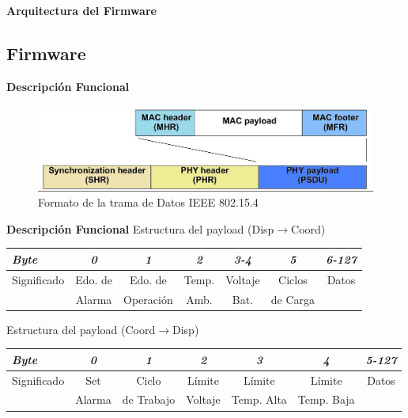 \documentclass[aspectratio=43, handout]{beamer}
\begin{document}
\begin{frame}{\textbf{\LARGE{Arquitectura del Firmware}}}
\end{frame}

\subsection[Firmware]{Firmware}

\begin{frame}{\textbf{\LARGE{Descripción Funcional}}}
\begin{figure}
	\centering
    \includegraphics[width=1\textwidth]{./imagenes/data.jpg}
    	\caption{Formato de la trama de Datos IEEE 802.15.4}
\end{figure}
\end{frame}

\begin{frame}{\textbf{\LARGE{Descripción Funcional}}}
\fontsize{15pt}{15}\selectfont
	\centering
	\noindent Estructura del payload (Disp$\rightarrow$Coord)
	\vspace{15px}
\begin{table}[ht]
	\centering
	\fontsize{8pt}{8}\selectfont

	\begin{tabular}{@{} l *6c @{}}    %
	\hline
		\emph{\textbf{Byte}} & \emph{\textbf{0}} & \emph{\textbf{1}} & \emph{\textbf{2}} & \emph{\textbf{3-4}} & \emph{\textbf{5}} & \emph{\textbf{6-127}}\\
		\hline
		Significado & Edo. de & Edo. de & Temp. & Voltaje & Ciclos & Datos\\
		 & Alarma & Operación & Amb. & Bat. & de Carga & \\
		\hline
	\end{tabular}
	\label{tab:dispcoor}
\end{table}
		\vspace{20px}
	\noindent Estructura del payload (Coord$\rightarrow$Disp)
\begin{table}[ht]
	\centering
	\fontsize{8pt}{8}\selectfont
		\vspace{15px}
	\begin{tabular}{@{} l *6c @{}}    %
	\hline
		\emph{\textbf{Byte}} & \emph{\textbf{0}} & \emph{\textbf{1}} & \emph{\textbf{2}} & \emph{\textbf{3}} & \emph{\textbf{4}} & \emph{\textbf{5-127}}\\
		\hline
		Significado & Set & Ciclo & Límite & Límite & Límite & Datos\\
		 & Alarma & de Trabajo & Voltaje & Temp. Alta & Temp. Baja & \\
		\hline
	\end{tabular}
	\label{tab:coordisp}
\end{table}
\end{frame}
\end{document}
